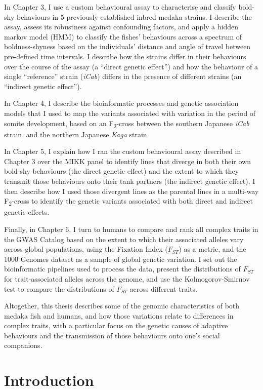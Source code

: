 \documentclass[
]{book}
\begin{document}
In Chapter 3, I use a custom behavioural assay to characterise and classify bold-shy behaviours in 5 previously-established inbred medaka strains. I describe the assay, assess its robustness against confounding factors, and apply a hidden markov model (HMM) to classify the fishes' behaviours across a spectrum of boldness-shyness based on the individuals' distance and angle of travel between pre-defined time intervals. I describe how the strains differ in their behaviours over the course of the assay (a ``direct genetic effect'') and how the behaviour of a single ``reference'' strain (\emph{iCab}) differs in the presence of different strains (an ``indirect genetic effect'').

In Chapter 4, I describe the bioinformatic processes and genetic association models that I used to map the variants associated with variation in the period of somite development, based on an F\textsubscript{2}-cross between the southern Japanese \emph{iCab} strain, and the northern Japanese \emph{Kaga} strain.

In Chapter 5, I explain how I ran the custom behavioural assay described in Chapter 3 over the MIKK panel to identify lines that diverge in both their own bold-shy behaviours (the direct genetic effect) and the extent to which they transmit those behaviours onto their tank partners (the indirect genetic effect). I then describe how I used those divergent lines as the parental lines in a multi-way F\textsubscript{2}-cross to identify the genetic variants associated with both direct and indirect genetic effects.

Finally, in Chapter 6, I turn to humans to compare and rank all complex traits in the GWAS Catalog based on the extent to which their associated alleles vary across global populations, using the Fixation Index (\(F_{ST}\)) as a metric, and the 1000 Genomes dataset as a sample of global genetic variation. I set out the bioinformatic pipelines used to process the data, present the distributions of \(F_{ST}\) for trait-associated alleles across the genome, and use the Kolmogorov-Smirnov test to compare the distributions of \(F_{ST}\) across different traits.

Altogether, this thesis describes some of the genomic characteristics of both medaka fish and humans, and how those variations relate to differences in complex traits, with a particular focus on the genetic causes of adaptive behaviours and the transmission of those behaviours onto one's social companions.

\hypertarget{Introduction}{%
\chapter{Introduction}\label{Introduction}}
\end{document}
